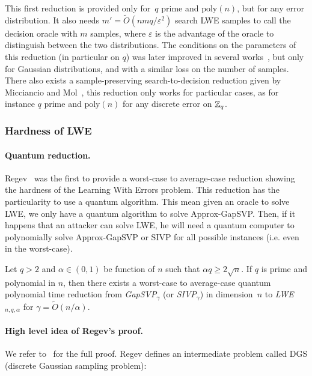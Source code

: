 This first reduction is provided only for~$q$ prime and $\text{poly}(n)$, but for any error distribution. It also needs $m' = \tilde{O}(nmq/\varepsilon^2)$ search LWE samples to call the decision oracle with $m$ samples, where $\varepsilon$ is the advantage of the oracle to distinguish between the two distributions. 
The conditions on the parameters of this reduction (in particular on $q$) was later improved in several works~\cite{Pei09,MP12,BLPRS13}, but only for Gaussian distributions, and with a similar loss on the number of samples.
There also exists a sample-preserving search-to-decision reduction given by Micciancio and Mol~\cite{MM11}, this reduction only works for particular cases, as for instance $q$ prime and $\text{poly}(n)$ for any discrete error on $\mathbb{Z}_q$.


\subsubsection{Hardness of LWE}



\paragraph{Quantum reduction.} Regev~\cite{Reg05,Reg09} was the first to provide a worst-case to average-case reduction showing the hardness of the Learning With Errors problem. This reduction has the particularity to use a quantum algorithm. This mean given an oracle to solve LWE, we only have a quantum algorithm to solve Approx-GapSVP. Then, if it happens that an attacker can solve LWE, he will need a quantum computer to polynomially solve Approx-GapSVP or SIVP for all possible instances (i.e. even in the worst-case). 

\begin{theorem}
Let $q >2$ and $\alpha \in (0,1)$ be function of $n$ such that $\alpha q \geq 2 \sqrt{n}$. If $q$ is prime and polynomial in $n$, then there exists a worst-case to average-case quantum polynomial time reduction from \emph{GapSVP}$_{\gamma}$ (or \emph{SIVP}$_{\gamma}$) in dimension~$n$ to \emph{LWE}$_{n,q,\alpha}$ for $\gamma = \tilde{O}(n/\alpha)$. 
\end{theorem}


\paragraph{High level idea of Regev's proof.} We refer to~\cite{Reg05} for the full proof. 
Regev defines an intermediate problem called DGS (discrete Gaussian sampling problem):


